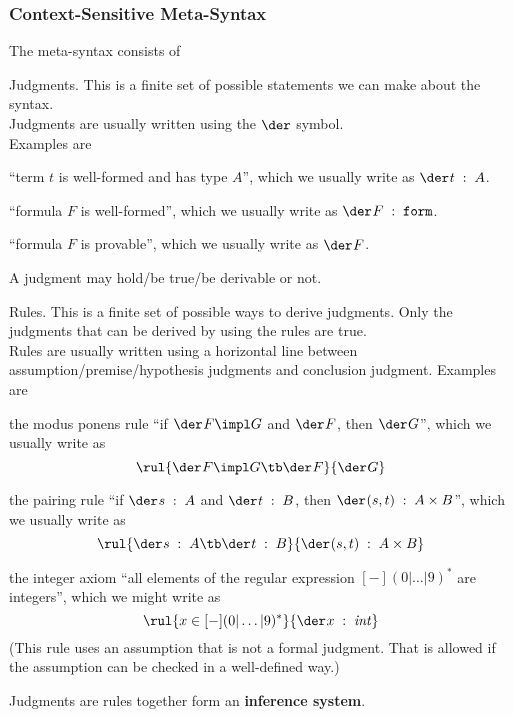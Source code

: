 \subsubsection{Context-Sensitive Meta-Syntax}

The meta-syntax consists of
\begin{compactitem}
 \item Judgments. This is a finite set of possible statements we can make about the syntax.\\
 Judgments are usually written using the $\der$ symbol.\\
 Examples are
  \begin{compactitem}
   \item ``term $t$ is well-formed and has type $A$'', which we usually write as $\oftype{}{}{t}{A}$.
   \item ``formula $F$ is well-formed'', which we usually write as $\oftype{}{}{F}{\form}$.
   \item ``formula $F$ is provable'', which we usually write as $\istrue{}{}{F}$.
  \end{compactitem}
 A judgment may hold/be true/be derivable or not.
 \item Rules. This is a finite set of possible ways to derive judgments. Only the judgments that can be derived by using the rules are true.\\
 Rules are usually written using a horizontal line between assumption/premise/hypothesis judgments and conclusion judgment.
  Examples are
  \begin{compactitem}
   \item the modus ponens rule ``if $\istrue{}{}{F\impl G}$ and $\istrue{}{}{F}$, then $\istrue{}{}{G}$'', which we usually write as
   \[\rul{\istrue{}{}{F\impl G} \tb \istrue{}{}{F}}{\istrue{}{}{G}}\]
   \item the pairing rule ``if $\oftype{}{}{s}{A}$ and $\oftype{}{}{t}{B}$, then $\oftype{}{}{(s,t)}{A\times B}$'', which we usually write as
   \[\rul{\oftype{}{}{s}{A} \tb \oftype{}{}{t}{B}}{\oftype{}{}{(s,t)}{A\times B}}\]
   \item the integer axiom ``all elements of the regular expression $[-](0|\ldots|9)^*$ are integers'', which we might write as
   \[\rul{x \in [-](0|\ldots|9)^*}{\oftype{}{}{x}{\Int}}\]
   (This rule uses an assumption that is not a formal judgment. That is allowed if the assumption can be checked in a well-defined way.)
 \end{compactitem}
\end{compactitem}
Judgments are rules together form an \textbf{inference system}.
 
